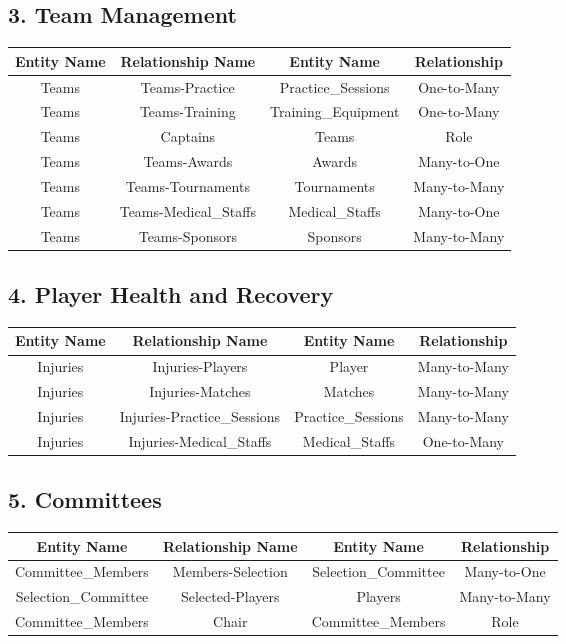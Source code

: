 \documentclass[a4paper, 12pt]{article}
\begin{document}
\subsection{3. Team Management}
\begin{tabular}{|C|C|C|C|}
\hline
    \textbf{Entity Name} &\textbf{Relationship Name} & \textbf{Entity Name} & \textbf{Relationship}\\\hline
        Teams & Teams-Practice & Practice\_Sessions & One-to-Many\\\hline
        Teams & Teams-Training & Training\_Equipment & One-to-Many\\\hline
        Teams & Captains & Teams & Role\\\hline
        Teams & Teams-Awards & Awards & Many-to-One\\\hline
        Teams & Teams-Tournaments & Tournaments & Many-to-Many\\\hline
        Teams & Teams-Medical\_Staffs & Medical\_Staffs & Many-to-One\\\hline
        Teams & Teams-Sponsors & Sponsors & Many-to-Many\\
\hline
\end{tabular}
\newline

\subsection{4. Player Health and Recovery}

\begin{tabular}{|C|C|C|C|}
\hline
    \textbf{Entity Name} &\textbf{Relationship Name} & \textbf{Entity Name} & \textbf{Relationship}\\\hline
        Injuries & Injuries-Players & Player & Many-to-Many\\\hline
        Injuries & Injuries-Matches & Matches & Many-to-Many\\\hline
        Injuries & Injuries-Practice\_Sessions & Practice\_Sessions & Many-to-Many\\\hline
        Injuries & Injuries-Medical\_Staffs & Medical\_Staffs & One-to-Many\\
\hline
\end{tabular}
\newline

\subsection{5. Committees}
\begin{tabular}{|C|C|C|C|}
\hline
    \textbf{Entity Name} &\textbf{Relationship Name} & \textbf{Entity Name} & \textbf{Relationship}\\\hline
         Committee\_Members & Members-Selection & Selection\_Committee & Many-to-One\\\hline
         Selection\_Committee & Selected-Players & Players & Many-to-Many\\\hline
         Committee\_Members & Chair& Committee\_Members & Role\\
        
         
        
\hline
\end{tabular}
\end{document}
